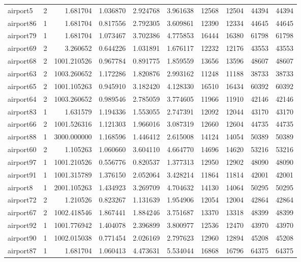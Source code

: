 \begin{longtable}{|l|r|r|r|r|r|r|r|r|r|}
airport5 & 2 & 1.681704 & 1.036870 & 2.924768 & 3.961638 & 12568 & 12504 & 44394 & 44394 \\
airport86 & 1 & 1.681704 & 0.817556 & 2.792305 & 3.609861 & 12390 & 12334 & 44645 & 44645 \\
airport79 & 1 & 1.681704 & 1.073467 & 3.702386 & 4.775853 & 16444 & 16380 & 61798 & 61798 \\
airport69 & 2 & 3.260652 & 0.644226 & 1.031891 & 1.676117 & 12232 & 12176 & 43553 & 43553 \\
airport68 & 2 & 1001.210526 & 0.967784 & 0.891775 & 1.859559 & 13656 & 13596 & 48607 & 48607 \\
airport63 & 2 & 1003.260652 & 1.172286 & 1.820876 & 2.993162 & 11248 & 11188 & 38733 & 38733 \\
airport65 & 2 & 1001.105263 & 0.945910 & 3.182420 & 4.128330 & 16510 & 16434 & 60392 & 60392 \\
airport64 & 2 & 1003.260652 & 0.989546 & 2.785059 & 3.774605 & 11966 & 11910 & 42146 & 42146 \\
airport83 & 1 & 1.631579 & 1.194336 & 1.553055 & 2.747391 & 12092 & 12044 & 43170 & 43170 \\
airport66 & 2 & 1001.526316 & 1.121303 & 1.966016 & 3.087319 & 12660 & 12604 & 44735 & 44735 \\
airport88 & 1 & 3000.000000 & 1.168596 & 1.446412 & 2.615008 & 14124 & 14054 & 50389 & 50389 \\
airport60 & 2 & 1.105263 & 1.060660 & 3.604110 & 4.664770 & 14696 & 14620 & 53216 & 53216 \\
airport97 & 1 & 1001.210526 & 0.556776 & 0.820537 & 1.377313 & 12950 & 12902 & 48090 & 48090 \\
airport91 & 1 & 1001.315789 & 1.376150 & 2.052064 & 3.428214 & 11864 & 11814 & 42001 & 42001 \\
airport8 & 1 & 2001.105263 & 1.434923 & 3.269709 & 4.704632 & 14130 & 14064 & 50295 & 50295 \\
airport72 & 2 & 1.210526 & 0.823267 & 1.131639 & 1.954906 & 12054 & 12004 & 42864 & 42864 \\
airport67 & 2 & 1002.418546 & 1.867441 & 1.884246 & 3.751687 & 13370 & 13318 & 48399 & 48399 \\
airport92 & 1 & 1001.776942 & 1.404078 & 2.396899 & 3.800977 & 12536 & 12470 & 43970 & 43970 \\
airport90 & 1 & 1002.015038 & 0.771454 & 2.026169 & 2.797623 & 12960 & 12894 & 45208 & 45208 \\
airport87 & 1 & 1.681704 & 1.060413 & 4.473631 & 5.534044 & 16868 & 16796 & 64375 & 64375 \\

\end{longtable}
